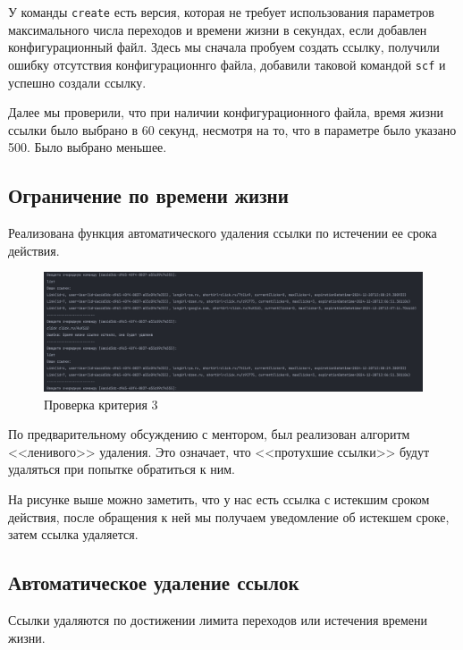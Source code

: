 \documentclass[a4paper, 14pt]{article}
\begin{document}
У команды \texttt{create} есть версия, которая не требует использования параметров максимального числа переходов и времени жизни в секундах, если добавлен конфигурационный файл.
Здесь мы сначала пробуем создать ссылку, получили ошибку отсутствия конфигурационнго файла, добавили таковой командой \texttt{scf} и успешно создали ссылку.

Далее мы проверили, что при наличии конфигурационного файла, время жизни ссылки было выбрано в 60 секунд, несмотря на то, что в параметре было указано 500. Было выбрано меньшее.

\subsection{Ограничение по времени жизни}

Реализована функция автоматического удаления ссылки по истечении ее срока действия.

\begin{figure}[H]
	\centering
	\includegraphics[width=17cm]{resources/7.png}
	\caption{Проверка критерия 3}
\end{figure}

По предварительному обсуждению с ментором, был реализован алгоритм <<ленивого>> удаления. Это означает, что <<протухшие ссылки>> будут удаляться при попытке обратиться к ним.

На рисунке выше можно заметить, что у нас есть ссылка с истекшим сроком действия, после обращения к ней мы получаем уведомление об истекшем сроке, затем ссылка удаляется.

\subsection{Автоматическое удаление ссылок}

Ссылки удаляются по достижении лимита переходов или истечения времени жизни.
\end{document}
